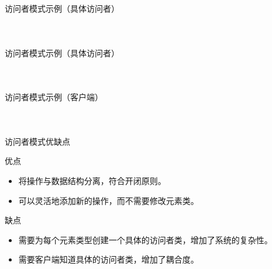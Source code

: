 \documentclass[UTF8,aspectratio=169]{beamer}
\begin{document}
\begin{frame}{访问者模式示例（具体访问者）}
    \begin{columns}
        \begin{column}{0.48\textwidth}
            \inputminted[firstline=60, lastline=73]{cpp}{code/visitor_pattern.cpp}
        \end{column}
        \begin{column}{0.48\textwidth}
            \inputminted[firstline=75, lastline=87]{cpp}{code/visitor_pattern.cpp}
        \end{column}
    \end{columns}
\end{frame}

\begin{frame}{访问者模式示例（具体访问者）}
    \begin{columns}
        \begin{column}{0.48\textwidth}
            \inputminted[firstline=89, lastline=101]{cpp}{code/visitor_pattern.cpp}
        \end{column}
        \begin{column}{0.48\textwidth}
            \inputminted[firstline=103, lastline=118]{cpp}{code/visitor_pattern.cpp}
        \end{column}
    \end{columns}
\end{frame}

\begin{frame}{访问者模式示例（客户端）}
    \begin{columns}
        \begin{column}{0.48\textwidth}
            \inputminted[firstline=120, lastline=132]{cpp}{code/visitor_pattern.cpp}
        \end{column}
        \begin{column}{0.48\textwidth}
            \inputminted[firstline=138, lastline=157]{cpp}{code/visitor_pattern.cpp}
        \end{column}
    \end{columns}
\end{frame}

\begin{frame}{访问者模式优缺点}
    \begin{ytublock}{优点}
        \begin{itemize}
            \item 将操作与数据结构分离，符合开闭原则。
            \item 可以灵活地添加新的操作，而不需要修改元素类。
        \end{itemize}
    \end{ytublock}
    \begin{alertytublock}{缺点}
        \begin{itemize}
            \item 需要为每个元素类型创建一个具体的访问者类，增加了系统的复杂性。
            \item 需要客户端知道具体的访问者类，增加了耦合度。
        \end{itemize}
    \end{alertytublock}
\end{frame}
\end{document}
